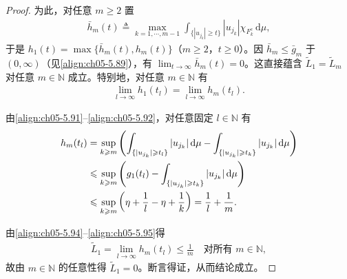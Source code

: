 \documentclass[../../main.tex]{subfiles}
\begin{document}
\begin{proof}
为此，对任意 $m\geqslant2$ 置
\begin{align*}
\bar h_m(t)\triangleq\max_{k=1,\cdots ,m-1}\int_{\{|u_{j_k}|\geqslant t\}}|u_{j_k}|\chi_{F_k^c}\,\mathrm{d}\mu,
\end{align*}
于是 $h_1(t)=\max\{\bar h_m(t),h_m(t)\}$（$m\geqslant2$，$t\geqslant0$）。因 $\bar h_m\leqslant\bar g_m$ 于 $(0,\infty)$（见\eqref{align:ch05-5.89}），有 $\lim_{t\to\infty}\bar h_m(t)=0$。这直接蕴含 $\tilde L_1=\tilde L_m$ 对任意 $m\in\mathbb{N}$ 成立。特别地，对任意 $m\in\mathbb{N}$ 有
\begin{align}
\lim_{l\to\infty}h_1(t_l)=\lim_{l\to\infty}h_m(t_l).\label{align:ch05-5.94}
\end{align}

由\eqref{align:ch05-5.91}--\eqref{align:ch05-5.92}，对任意固定 $l\in\mathbb{N}$ 有
\begin{align}
h_m(t_l)&=\sup_{k\geqslant m}\left(\int_{\{|u_{j_k}|\geqslant t_l\}}|u_{j_k}|\,\mathrm{d}\mu-\int_{\{|u_{j_k}|\geqslant t_k\}}|u_{j_k}|\,\mathrm{d}\mu\right)\notag\\
&\leqslant\sup_{k\geqslant m}\left(g_1(t_l)-\int_{\{|u_{j_k}|\geqslant t_k\}}|u_{j_k}|\,\mathrm{d}\mu\right)\notag\\
&\leqslant\sup_{k\geqslant m}\left(\eta+\frac1l-\eta+\frac1k\right)=\frac1l+\frac1m.\label{align:ch05-5.95}
\end{align}

由\eqref{align:ch05-5.94}--\eqref{align:ch05-5.95}得
\begin{align*}
\tilde L_1=\lim_{l\to\infty}h_m(t_l)\leqslant\frac1m\quad\text{对所有 }m\in\mathbb{N},
\end{align*}
故由 $m\in\mathbb{N}$ 的任意性得 $\tilde L_1=0$。断言得证，从而结论成立。
\end{proof}
\end{document}
